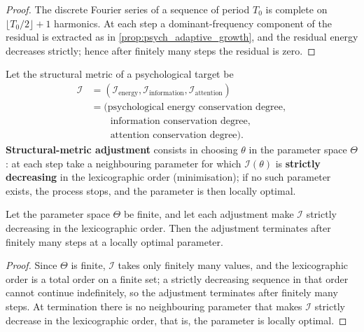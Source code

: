 \begin{proof}
The discrete Fourier series of a sequence of period $T_0$ is complete on $\lfloor T_0/2\rfloor+1$ harmonics. At each step a dominant-frequency component of the residual is extracted as in \cref{prop:psych_adaptive_growth}, and the residual energy decreases strictly; hence after finitely many steps the residual is zero.
\end{proof}

\begin{definition}\label{def:psych_structure_metric_adjustment}
Let the structural metric of a psychological target be
\[
\begin{aligned}
\mathcal I&=(\mathcal I_{\text{energy}},\mathcal I_{\text{information}},\mathcal I_{\text{attention}})\\
&=\bigl(\text{psychological energy conservation degree},\\
&\qquad\text{information conservation degree},\\
&\qquad\text{attention conservation degree}\bigr).
\end{aligned}
\]
\textbf{Structural-metric adjustment} consists in choosing $\theta$ in the parameter space $\Theta$: at each step take a neighbouring parameter for which $\mathcal I(\theta)$ is \textbf{strictly decreasing} in the lexicographic order (minimisation); if no such parameter exists, the process stops, and the parameter is then locally optimal.
\end{definition}

\begin{proposition}\label{prop:psych_structure_metric_convergence}
Let the parameter space $\Theta$ be finite, and let each adjustment make $\mathcal I$ strictly decreasing in the lexicographic order. Then the adjustment terminates after finitely many steps at a locally optimal parameter.
\end{proposition}

\begin{proof}
Since $\Theta$ is finite, $\mathcal I$ takes only finitely many values, and the lexicographic order is a total order on a finite set; a strictly decreasing sequence in that order cannot continue indefinitely, so the adjustment terminates after finitely many steps. At termination there is no neighbouring parameter that makes $\mathcal I$ strictly decrease in the lexicographic order, that is, the parameter is locally optimal.
\end{proof}

